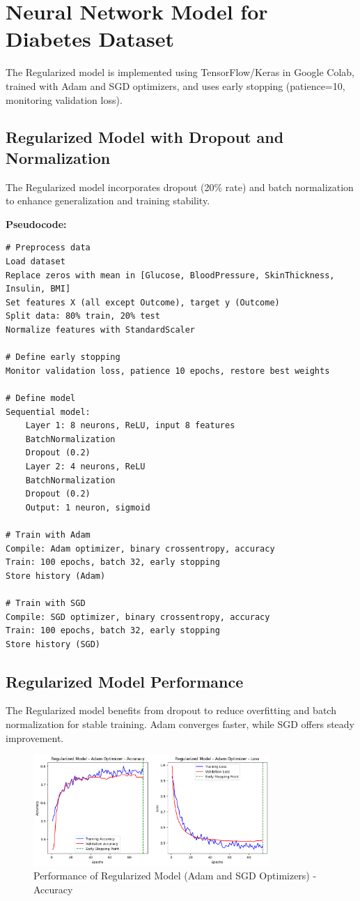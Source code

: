 \documentclass[a4paper,12pt]{article}
\begin{document}
\section*{Neural Network Model for Diabetes Dataset}
The Regularized model is implemented using TensorFlow/Keras in Google Colab, trained with Adam and SGD optimizers, and uses early stopping (patience=10, monitoring validation loss).

\subsection*{Regularized Model with Dropout and Normalization}
The Regularized model incorporates dropout (20\% rate) and batch normalization to enhance generalization and training stability.

\textbf{Pseudocode:}
\begin{verbatim}
# Preprocess data
Load dataset
Replace zeros with mean in [Glucose, BloodPressure, SkinThickness, Insulin, BMI]
Set features X (all except Outcome), target y (Outcome)
Split data: 80% train, 20% test
Normalize features with StandardScaler

# Define early stopping
Monitor validation loss, patience 10 epochs, restore best weights

# Define model
Sequential model:
    Layer 1: 8 neurons, ReLU, input 8 features
    BatchNormalization
    Dropout (0.2)
    Layer 2: 4 neurons, ReLU
    BatchNormalization
    Dropout (0.2)
    Output: 1 neuron, sigmoid

# Train with Adam
Compile: Adam optimizer, binary crossentropy, accuracy
Train: 100 epochs, batch 32, early stopping
Store history (Adam)

# Train with SGD
Compile: SGD optimizer, binary crossentropy, accuracy
Train: 100 epochs, batch 32, early stopping
Store history (SGD)
\end{verbatim}

\subsection*{Regularized Model Performance}
The Regularized model benefits from dropout to reduce overfitting and batch normalization for stable training. Adam converges faster, while SGD offers steady improvement.

\begin{figure}[H]
    \centering
    \includegraphics[width=0.8\textwidth]{assets/diabetes/adam_diabetes_loss.png}
    \caption{Performance of Regularized Model (Adam and SGD Optimizers) - Accuracy}
\end{figure}
\end{document}
